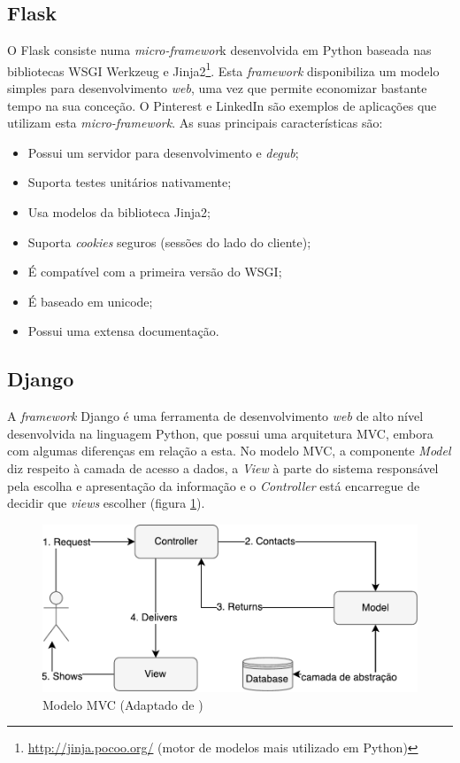 \subsection{Flask}


O Flask consiste numa \textit{micro-framewor}k desenvolvida em Python baseada nas bibliotecas \ac{WSGI} Werkzeug e Jinja2\footnote{\url{http://jinja.pocoo.org/} (motor de modelos mais utilizado em Python)}. Esta \textit{framework} disponibiliza um  modelo simples para desenvolvimento \textit{web}, uma vez que permite economizar bastante tempo na sua conceção. O Pinterest e LinkedIn são exemplos de aplicações que utilizam esta \textit{micro-framework}. As suas principais características  são\cite{Flask2014}:  


\begin{itemize}
	\item Possui um servidor para desenvolvimento e \textit{degub}; 
	\item Suporta testes unitários nativamente; 
	\item Usa modelos da biblioteca Jinja2; 
	\item Suporta \textit{cookies} seguros (sessões do lado do cliente); 
	\item É compatível com a primeira versão do \ac{WSGI}; 
	\item É baseado em unicode; 
	\item Possui uma extensa documentação.
\end{itemize}




\subsection{Django}
\label{django}

A \textit{framework} Django é uma ferramenta de desenvolvimento \textit{web} de alto nível desenvolvida na linguagem Python, que possui uma arquitetura \ac{MVC}\cite{Deacon2005}, embora com algumas diferenças em relação a esta. No modelo \ac{MVC}, a componente \textit{Model} diz respeito à camada de acesso a dados, a \textit{View} à parte do sistema responsável pela escolha e apresentação da informação e o \textit{Controller} está encarregue de decidir que \textit{views} escolher (figura \ref{mvcdiag}). 



\begin{figure}[!htb]
	\centering
	\includegraphics[scale=0.7]{esquemas/MVC-diagram.pdf}
	\caption[]{Modelo \ac{MVC} (Adaptado de \cite{Sugrue2013})}
	\label{mvcdiag}
\end{figure}

